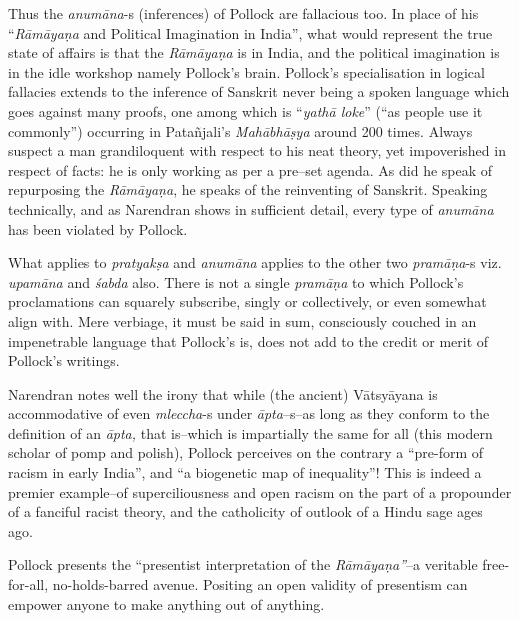Thus the \textit{anumāna}-s (inferences) of Pollock are fallacious too. In place of his “\textit{Rāmāyaṇa} and Political Imagination in India”, what would represent the true state of affairs is that the \textit{Rāmāyaṇa} is in India, and the political imagination is in the idle workshop namely Pollock’s brain. Pollock’s specialisation in logical fallacies extends to the inference of Sanskrit never being a spoken language which goes against many proofs, one among which is “\textit{yathā loke}” (“as people use it commonly”) occurring in Patañjali’s \textit{Mahābhāṣya} around 200 times. Always suspect a man grandiloquent with respect to his neat theory, yet impoverished in respect of facts: he is only working as per a pre–set agenda. As did he speak of repurposing the \textit{Rāmāyaṇa}, he speaks of the reinventing of Sanskrit. Speaking technically, and as Narendran shows in sufficient detail, every type of \textit{anumāna} has been violated by Pollock.

What applies to \textit{pratyakṣa} and \textit{anumāna} applies to the other two \textit{pramāṇa}-s viz. \textit{upamāna} and \textit{śabda} also. There is not a single \textit{pramāṇa} to which Pollock’s proclamations can squarely subscribe, singly or collectively, or even somewhat align with. Mere verbiage, it must be said in sum, consciously couched in an impenetrable language that Pollock’s is, does not add to the credit or merit of Pollock’s writings.

Narendran notes well the irony that while (the ancient) Vātsyāyana is accommodative of even \textit{mleccha}-s under \textit{āpta}–s–as long as they conform to the definition of an \textit{āpta,} that is–which is impartially the same for all (this modern scholar of pomp and polish), Pollock perceives on the contrary a “pre-form of racism in early India”, and “a biogenetic map of inequality”! This is indeed a premier example–of superciliousness and open racism on the part of a propounder of a fanciful racist theory, and the catholicity of outlook of a Hindu sage ages ago.

Pollock presents the “presentist interpretation of the \textit{Rāmāyaṇa”}–a veritable free-for-all, no-holds-barred avenue. Positing an open validity of presentism can empower anyone to make anything out of anything.

